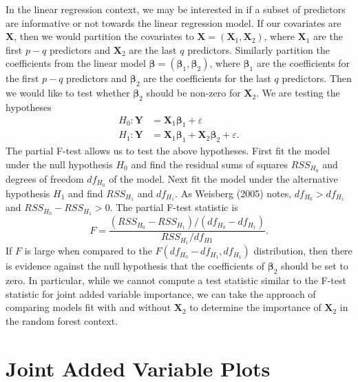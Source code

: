 \documentclass[12pt,twoside]{reedthesis}
\theoremstyle{definition}
\theoremstyle{definition}
\theoremstyle{definition}
\theoremstyle{remark}
\begin{document}
In the linear regression context, we may be interested in if a subset of
predictors are informative or not towards the linear regression model.
If our covariates are \(\mathbf{X}\), then we would partition the
covariates to \(\mathbf{X}=(\mathbf{X}_1,\mathbf{X}_2)\), where
\(\mathbf{X}_1\) are the first \(p-q\) predictors and \(\mathbf{X}_2\)
are the last \(q\) predictors. Similarly partition the coefficients from
the linear model \(\mathbf{\beta}=(\mathbf{\beta}_1,\mathbf{\beta}_2)\),
where \(\mathbf{\beta}_1\) are the coefficients for the first \(p-q\)
predictors and \(\mathbf{\beta}_2\) are the coefficients for the last
\(q\) predictors. Then we would like to test whether
\(\mathbf{\beta}_2\) should be non-zero for \(\mathbf{X}_2\). We are
testing the hypotheses
\begin{align}
H_0: \mathbf{Y}&=\mathbf{X}_1\mathbf{\beta}_1+\varepsilon \nonumber \\
H_1: \mathbf{Y}&=\mathbf{X}_1\mathbf{\beta}_1+\mathbf{X}_2\mathbf{\beta}_2+\varepsilon. \nonumber
\end{align}
The partial F-test allows us to test the above hypotheses. First fit the
model under the null hypothesis \(H_0\) and find the residual sums of
squares \(RSS_{H_0}\) and degrees of freedom \(df_{H_0}\) of the model.
Next fit the model under the alternative hypothesis \(H_1\) and find
\(RSS_{H_1}\) and \(df_{H_1}\). As Weisberg (2005) notes,
\(df_{H_0}>df_{H_1}\) and \(RSS_{H_0}-RSS_{H_1}>0\). The partial F-test
statistic is
\[F=\frac{(RSS_{H_0}-RSS_{H_1})/(df_{H_0}-df_{H_1})}{RSS_{H_1}/df_{H1}}.\]
If \(F\) is large when compared to the
\(F(df_{H_0}-df_{H_1}, df_{H_1})\) distribution, then there is evidence
against the null hypothesis that the coefficients of
\(\mathbf{\beta}_2\) should be set to zero. In particular, while we
cannot compute a test statistic similar to the F-test statistic for
joint added variable importance, we can take the approach of comparing
models fit with and without \(\mathbf{X}_2\) to determine the importance
of \(\mathbf{X}_2\) in the random forest context. \par

\section{Joint Added Variable Plots}\label{joint-added-variable-plots}
\end{document}
